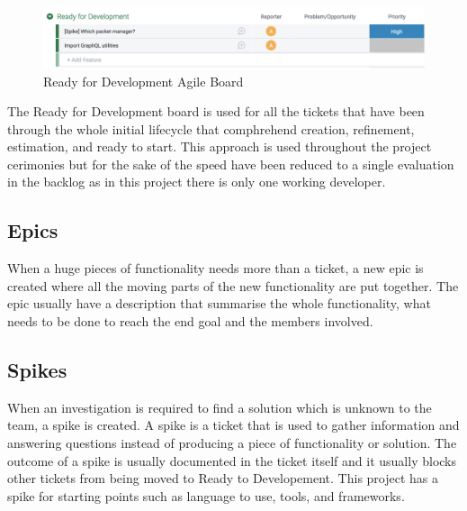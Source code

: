 \begin{figure}[H]
  \centering
  \includegraphics[width=1\textwidth]{figures/readyfordev}
  \caption{Ready for Development Agile Board}
  \label{f:readyfordev}
\end{figure}

The Ready for Development board is used for all the tickets that have been
through the whole initial lifecycle that comphrehend creation, refinement,
estimation, and ready to start. This approach is used throughout the project
cerimonies but for the sake of the speed have been reduced to a single
evaluation in the backlog as in this project there is only one working developer.

\subsection{Epics}
\label{s:Epic}
When a huge pieces of functionality needs more than a ticket, a new epic is created
where all the moving parts of the new functionality are put together. The epic
usually have a description that summarise the whole functionality, what needs
to be done to reach the end goal and the members involved.

\subsection{Spikes}
\label{s:Spikes}
When an investigation is required to find a solution which is unknown to the team,
a spike is created. A spike is a ticket that is used to gather information and
answering questions instead of producing a piece of functionality or solution.
The outcome of a spike is usually documented in the ticket itself and it usually
blocks other tickets from being moved to Ready to Developement. This project
has a spike for starting points such as language to use, tools, and frameworks.
